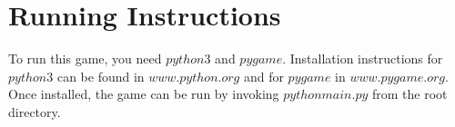 \begin{itemize}
\begin{enumerate}
      \end{enumerate}
  
\end{itemize}

\section{Running Instructions}
To run this game, you need $python3$ and $pygame$. Installation instructions for $python3$ can be found in $www.python.org$ and for $pygame$ in $www.pygame.org$. Once installed, the game can be run by invoking $python main.py$ from the root directory.